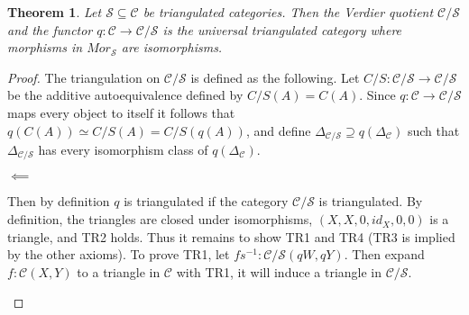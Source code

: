 \documentclass[11pt]{article}
\newtheorem{theorem}{Theorem}[section]
\theoremstyle{definition}
\theoremstyle{remark}
\begin{document}
            \begin{theorem}
                Let $\mathcal{S}\subseteq\mathcal{C}$ be triangulated categories. Then the Verdier quotient $\mathcal{C}/\mathcal{S}$ and the functor $q:\mathcal{C}\rightarrow\mathcal{C}/\mathcal{S}$ is the universal triangulated category where morphisms in $Mor_\mathcal{S}$ are isomorphisms.
            \end{theorem}

            \begin{proof}
                The triangulation on $\mathcal{C}/\mathcal{S}$ is defined as the following. Let $C/S:\mathcal{C}/\mathcal{S}\rightarrow\mathcal{C}/\mathcal{S}$ be the additive autoequivalence defined by $C/S(A)=C(A)$. Since $q:\mathcal{C}\rightarrow\mathcal{C}/\mathcal{S}$ maps every object to itself it follows that $q(C(A)) \simeq C/S(A) = C/S(q(A))$, and define $\Delta_{\mathcal{C}/\mathcal{S}}\supseteq q(\Delta_\mathcal{C})$ such that $\Delta_{\mathcal{C}/\mathcal{S}}$ has every isomorphism class of $q(\Delta_\mathcal{C})$. 
                \begin{center}
                    $\impliedby$
                \end{center}
                Then by definition $q$ is triangulated if the category $\mathcal{C}/\mathcal{S}$ is triangulated.
                By definition, the triangles are closed under isomorphisms, $(X,X,0,id_X,0,0)$ is a triangle, and TR2 holds. Thus it remains to show TR1 and TR4 (TR3 is implied by the other axioms). To prove TR1, let $fs^{-1}:\mathcal{C}/\mathcal{S}(qW,qY)$. Then expand $f:\mathcal{C}(X,Y)$ to a triangle in $\mathcal{C}$ with TR1, it will induce a triangle in  $\mathcal{C}/\mathcal{S}$.
                \begin{center}

\end{center}
\end{proof}
\end{document}
